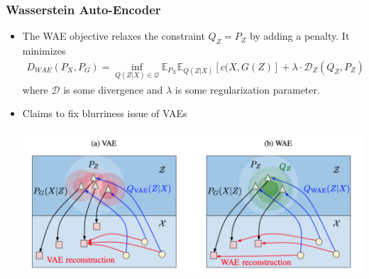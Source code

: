 \documentclass{beamer}
\newcommand{\E}{\mathbb{E}}
\newcommand{\col}[1]{\textcolor{lred}{#1}}
\begin{document}
\begin{frame}
\frametitle{Wasserstein Auto-Encoder}
\begin{itemize}
\item The \col{WAE objective} relaxes the constraint $Q_Z = P_Z$ by adding a penalty.  It minimizes
\begin{align*}
D_{WAE}(P_X, P_G) =  \inf_{Q(Z \vert X) \in \mathcal{Q}} \E_{P_X} \E_{Q(Z \vert X)} [c(X, G(Z)]+ \lambda \cdot \mathcal{D}_Z(Q_Z, P_Z)
\end{align*}
where $\mathcal{D}$ is some divergence and $\lambda$ is some regularization parameter. 

\pause

\item Claims to fix \col{blurriness issue} of VAEs

\begin{center}
\includegraphics[scale=0.4]{wae-vae}
\end{center}

\end{itemize}
\end{frame}
\end{document}

